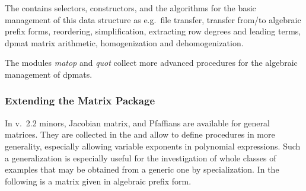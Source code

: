 The  contains selectors, constructors, and the
algorithms for the basic management of this data structure as e.g.\
file transfer, transfer from/to algebraic prefix forms, reordering,
simplification, extracting row degrees and leading terms, dpmat matrix
arithmetic, homogenization and dehomogenization.

The modules \emph{matop} and \emph{quot} collect more advanced procedures
for the algebraic management of dpmats.

\subsubsection{Extending the \REDUCE Matrix Package}

In v.~2.2 minors, Jacobian matrix, and Pfaffians are available for
general \REDUCE matrices. They are collected in the  and allow to define procedures in more generality, especially
allowing variable exponents in polynomial expressions. Such a
generalization is especially useful for the investigation of whole
classes of examples that may be obtained from a generic one by
specialization. In the following  is a matrix given in algebraic
prefix form.

